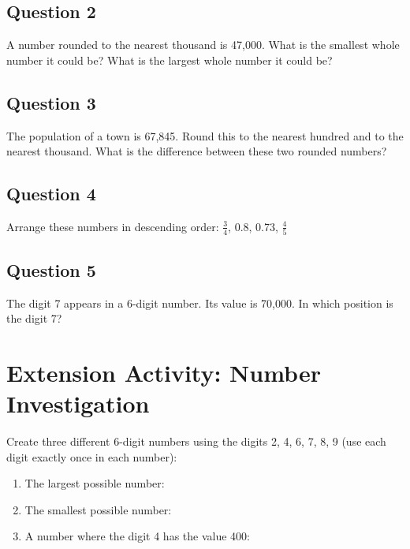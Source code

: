\documentclass{article}
\begin{document}
\subsection*{Question 2}
A number rounded to the nearest thousand is 47,000. What is the smallest whole number it could be? What is the largest whole number it could be?

\vspace{2cm}

\subsection*{Question 3}
The population of a town is 67,845. Round this to the nearest hundred and to the nearest thousand. What is the difference between these two rounded numbers?

\vspace{2cm}

\subsection*{Question 4}
Arrange these numbers in descending order: $\frac{3}{4}$, 0.8, 0.73, $\frac{4}{5}$

\vspace{2cm}

\subsection*{Question 5}
The digit 7 appears in a 6-digit number. Its value is 70,000. In which position is the digit 7?

\vspace{2cm}

\section{Extension Activity: Number Investigation}
Create three different 6-digit numbers using the digits 2, 4, 6, 7, 8, 9 (use each digit exactly once in each number):

\begin{enumerate}
    \item The largest possible number: \underline{\hspace{4cm}}
    \item The smallest possible number: \underline{\hspace{4cm}}
    \item A number where the digit 4 has the value 400: \underline{\hspace{4cm}}
\end{enumerate}
\end{document}
